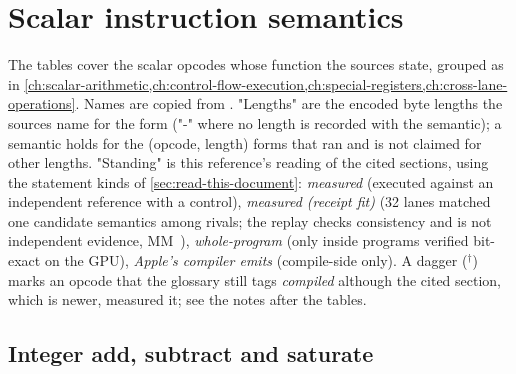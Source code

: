 \chapter{Scalar instruction semantics}\label{app:b}

The tables cover the scalar opcodes whose function the sources state, grouped as in \cref{ch:scalar-arithmetic,ch:control-flow-execution,ch:special-registers,ch:cross-lane-operations}. Names are copied from . "Lengths" are the encoded byte lengths the sources name for the form ("-" where no length is recorded with the semantic); a semantic holds for the (opcode, length) forms that ran and is not claimed for other lengths. "Standing" is this reference's reading of the cited sections, using the statement kinds of \cref{sec:read-this-document}: \emph{measured} (executed against an independent reference with a control), \emph{measured (receipt fit)} (32 lanes matched one candidate semantics among rivals; the replay checks consistency and is not independent evidence, MM~), \emph{whole-program} (only inside programs verified bit-exact on the GPU), \emph{Apple's compiler emits} (compile-side only). A dagger ($^\dagger$) marks an opcode that the glossary still tags \emph{compiled} although the cited section, which is newer, measured it; see the notes after the tables.

\section{Integer add, subtract and saturate}\label{sec:integer-add-subtract}


